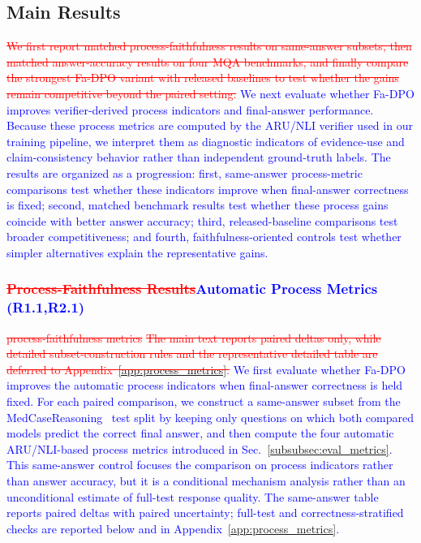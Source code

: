 \documentclass[a4paper,fleqn,doubleblind]{cas-sc}
\DeclareRobustCommand{\deleted}[1]{\textcolor{red}{\sout{#1}}}
\DeclareRobustCommand{\added}[1]{\textcolor{blue}{#1}}
\DeclareRobustCommand{\revtag}[1]{\textcolor{blue}{\scriptsize\,(\textbf{#1})}}
\begin{document}
\subsection{Main Results}
\label{subsec:main_results}
\deleted{We first report matched process-faithfulness results on same-answer subsets, then matched answer-accuracy results on four MQA benchmarks, and finally compare the strongest Fa-DPO variant with released baselines to test whether the gains remain competitive beyond the paired setting.}
\added{We next evaluate whether Fa-DPO improves verifier-derived process indicators and final-answer performance. Because these process metrics are computed by the ARU/NLI verifier used in our training pipeline, we interpret them as diagnostic indicators of evidence-use and claim-consistency behavior rather than independent ground-truth labels. The results are organized as a progression: first, same-answer process-metric comparisons test whether these indicators improve when final-answer correctness is fixed; second, matched benchmark results test whether these process gains coincide with better answer accuracy; third, released-baseline comparisons test broader competitiveness; and fourth, faithfulness-oriented controls test whether simpler alternatives explain the representative gains.}

\subsubsection{\deleted{Process-Faithfulness Results}\added{Automatic Process Metrics}\revtag{R1.1,R2.1}}
\deleted{process-faithfulness metrics}
\deleted{The main text reports paired deltas only, while detailed subset-construction rules and the representative detailed table are deferred to Appendix~\ref{app:process_metrics}.}
\added{We first evaluate whether Fa-DPO improves the automatic process indicators when final-answer correctness is held fixed. For each paired comparison, we construct a same-answer subset from the MedCaseReasoning~\cite{wu2025medcasereasoning} test split by keeping only questions on which both compared models predict the correct final answer, and then compute the four automatic ARU/NLI-based process metrics introduced in Sec.~\ref{subsubsec:eval_metrics}. This same-answer control focuses the comparison on process indicators rather than answer accuracy, but it is a conditional mechanism analysis rather than an unconditional estimate of full-test response quality. The same-answer table reports paired deltas with paired uncertainty; full-test and correctness-stratified checks are reported below and in Appendix~\ref{app:process_metrics}.}
\end{document}
